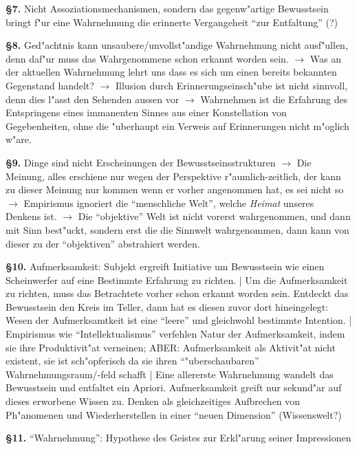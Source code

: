 \documentclass[emulatestandardclasses]{scrartcl}
\begin{document}
\textbf{\S 7.} Nicht Assoziationsmechanismen, sondern das gegenw"artige Bewusstsein bringt f"ur eine Wahrnehmung die erinnerte Vergangeheit "`zur Entfaltung"' (?)\newline

\textbf{\S 8.} Ged"achtnis kann unsaubere/unvollst"andige Wahrnehmung nicht ausf"ullen, denn daf"ur muss das Wahrgenommene schon erkannt worden sein. $\rightarrow$ Was an der aktuellen Wahrnehmung lehrt uns dass es sich um einen bereits bekannten Gegenstand handelt? $\rightarrow$ Illusion durch Erinnerungseinsch"ube ist nicht sinnvoll, denn dies l"asst den Sehenden aussen vor $\rightarrow$ Wahrnehmen ist die Erfahrung des Entspringens eines immanenten Sinnes aus einer Konstellation von Gegebenheiten, ohne die "uberhaupt ein Verweis auf Erinnerungen nicht m"oglich w"are.\newline

\textbf{\S 9.} Dinge sind nicht Erscheinungen der Bewusstseinsstrukturen $\rightarrow$ Die Meinung, alles erschiene nur wegen der Perspektive r"aumlich-zeitlich, der kann zu dieser Meinung nur kommen wenn er vorher angenommen hat, es sei nicht so $\rightarrow$ Empirismus ignoriert die "`menschliche Welt"', welche \emph{Heimat} unseres Denkens ist. $\rightarrow$ Die "`objektive"' Welt ist nicht vorerst wahrgenommen, und dann mit Sinn best"uckt, sondern erst die die Sinnwelt wahrgenommen, dann kann von dieser zu der "`objektiven"' abstrahiert werden.\newline

\textbf{\S 10.} Aufmerksamkeit: Subjekt ergreift Initiative um Bewusstsein wie einen Scheinwerfer auf eine Bestimmte Erfahrung zu richten. | Um die Aufmerksamkeit zu richten, muss das Betrachtete vorher schon erkannt worden sein. Entdeckt das Bewusstsein den Kreis im Teller, dann hat es diesen zuvor dort hineingelegt: Wesen der Aufmerksamtkeit ist eine "`leere"' und gleichwohl bestimmte Intention. | Empirismus wie "`Intellektualismus"' verfehlen Natur der Aufmerksamkeit, indem sie ihre Produktivit"at verneinen; ABER: Aufmerksamkeit als Aktivit"at nicht existent, sie ist sch"opferisch da sie ihren "`"uberschaubaren"' Wahrnehmungsraum/-feld schafft | Eine allererste Wahrnehmung wandelt das Bewusstsein und entfaltet ein Apriori. Aufmerksamkeit greift nur sekund"ar auf dieses erworbene Wissen zu. Denken als gleichzeitiges Aufbrechen von Ph"anomenen und Wiederherstellen in einer "`neuen Dimension"' (Wissenswelt?)\newline

\textbf{\S 11.} "`Wahrnehmung"': Hypothese des Geistes zur Erkl"arung seiner Impressionen
\end{document}
